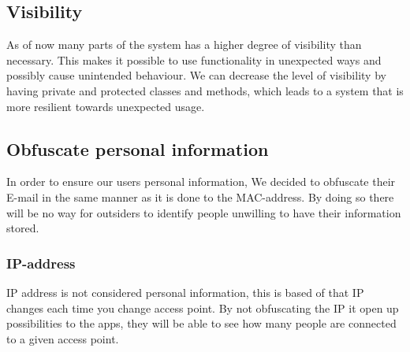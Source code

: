 \subsection*{Visibility}
As of now many parts of the system has a higher degree of visibility than necessary. This makes it possible to use functionality in unexpected ways and possibly cause unintended behaviour. We can decrease the level of visibility by having private and protected classes and methods, which leads to a system that is more resilient towards unexpected usage.
 
\subsection*{Obfuscate personal information}
In order to ensure our users personal information, We decided to obfuscate their E-mail in the same manner as it is done to the MAC-address. By doing so there will be no way for outsiders to identify people unwilling to have their information stored.

\subsubsection*{IP-address}
IP address is not considered personal information, this is based of that IP changes each time you change access point. By not obfuscating the IP it open up possibilities to the apps, they will be able to see how many people are connected to a given access point. 